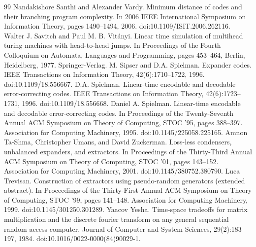 \begin{thebibliography}{99}
 Nandakishore Santhi and Alexander Vardy. Minimum distance of codes and their branching program complexity. In 2006 IEEE International Symposium on Information Theory, pages 1490–1494, 2006. doi:10.1109/ISIT.2006.262116.
 Walter J. Savitch and Paul M. B. Vitányi. Linear time simulation of multihead turing machines with head-to-head jumps. In Proceedings of the Fourth Colloquium on Automata, Languages and Programming, pages 453–464, Berlin, Heidelberg, 1977. Springer-Verlag.
 M. Sipser and D.A. Spielman. Expander codes. IEEE Transactions on Information Theory, 42(6):1710–1722, 1996. doi:10.1109/18.556667.
 D.A. Spielman. Linear-time encodable and decodable error-correcting codes. IEEE Transactions on Information Theory, 42(6):1723–1731, 1996. doi:10.1109/18.556668.
 Daniel A. Spielman. Linear-time encodable and decodable error-correcting codes. In Proceedings of the Twenty-Seventh Annual ACM Symposium on Theory of Computing, STOC ’95, pages 388–397. Association for Computing Machinery, 1995. doi:10.1145/225058.225165.
 Amnon Ta-Shma, Christopher Umans, and David Zuckerman. Loss-less condensers, unbalanced expanders, and extractors. In Proceedings of the Thirty-Third Annual ACM Symposium on Theory of Computing, STOC ’01, pages 143–152. Association for Computing Machinery, 2001. doi:10.1145/380752.380790.
 Luca Trevisan. Construction of extractors using pseudo-random generators (extended abstract). In Proceedings of the Thirty-First Annual ACM Symposium on Theory of Computing, STOC ’99, pages 141–148. Association for Computing Machinery, 1999. doi:10.1145/301250.301289.
 Yaacov Yesha. Time-space tradeoffs for matrix multiplication and the discrete fourier transform on any general sequential random-access computer. Journal of Computer and System Sciences, 29(2):183–197, 1984. doi:10.1016/0022-0000(84)90029-1.
\end{thebibliography}

